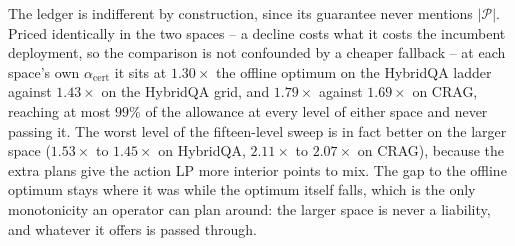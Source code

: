 The ledger is indifferent by construction, since its guarantee never
mentions $|\mathcal{P}|$. Priced identically in the two spaces -- a
decline costs what it costs the incumbent deployment, so the comparison
is not confounded by a cheaper fallback -- at each space's own
$\alpha_{\mathrm{cert}}$ it sits at $1.30\times$ the offline optimum on
the HybridQA ladder against $1.43\times$ on the HybridQA grid, and
$1.79\times$ against $1.69\times$ on CRAG, reaching
at most $99\%$ of the allowance at every level of either space and never
passing it. The worst level of the fifteen-level sweep is
in fact better on the larger space ($1.53\times$ to $1.45\times$ on
HybridQA, $2.11\times$ to $2.07\times$ on CRAG), because the extra plans
give the action LP more interior points to mix. The gap to the offline
optimum stays where it was while the optimum itself falls, which is the
only monotonicity an operator can plan around: the larger space is never
a liability, and whatever it offers is passed through.



